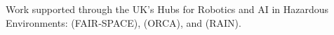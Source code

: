 
\begin{acks}
Work supported through the UK's  Hubs for Robotics and AI in Hazardous Environments:  (FAIR-SPACE),  (ORCA), and  (RAIN).
\end{acks}
